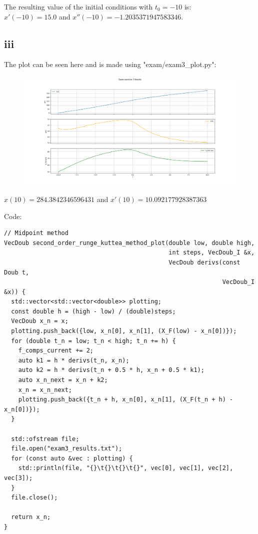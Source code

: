 \documentclass{article}
\begin{document}
The resulting value of the initial conditions with $t_0=-10$ is:\\
$x'(-10)=15.0$ and $x''(-10)=-1.2035371947583346$.

\subsection*{iii}
The plot can be seen here and is made using "exam/exam3\_plot.py":
\begin{figure}[H]
  \centering
  \includegraphics[width=\textwidth]{../exam3_plot.png}
\end{figure}

$x(10)=284.3842346596431$ and $x'(10)=10.092177928387363$

Code:
\begin{verbatim}
// Midpoint method
VecDoub second_order_runge_kuttea_method_plot(double low, double high,
                                              int steps, VecDoub_I &x,
                                              VecDoub derivs(const Doub t,
                                                             VecDoub_I &x)) {
  std::vector<std::vector<double>> plotting;
  const double h = (high - low) / (double)steps;
  VecDoub x_n = x;
  plotting.push_back({low, x_n[0], x_n[1], (X_F(low) - x_n[0])});
  for (double t_n = low; t_n < high; t_n += h) {
    f_comps_current += 2;
    auto k1 = h * derivs(t_n, x_n);
    auto k2 = h * derivs(t_n + 0.5 * h, x_n + 0.5 * k1);
    auto x_n_next = x_n + k2;
    x_n = x_n_next;
    plotting.push_back({t_n + h, x_n[0], x_n[1], (X_F(t_n + h) - x_n[0])});
  }

  std::ofstream file;
  file.open("exam3_results.txt");
  for (const auto &vec : plotting) {
    std::println(file, "{}\t{}\t{}\t{}", vec[0], vec[1], vec[2], vec[3]);
  }
  file.close();

  return x_n;
}
\end{verbatim}
\end{document}
